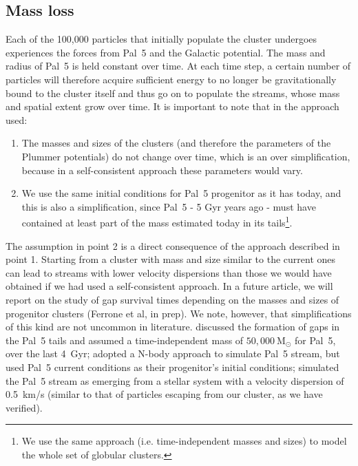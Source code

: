 \documentclass{aa}
\begin{document}
\subsection{Mass loss}\label{sec:mass_loss}

Each of the 100,000 particles that initially populate the cluster undergoes experiences the forces from Pal~5 and the Galactic potential. The mass and radius of Pal~5 is held constant over time. At each time step, a certain number of particles will therefore acquire sufficient energy to no longer be gravitationally bound to the cluster itself and thus go on to populate the streams, whose mass and spatial extent grow over time. It is important to note that in the approach used:

\begin{enumerate}
    \item The masses and sizes of the clusters (and therefore the parameters of the Plummer potentials) do not change over time, which is an over simplification, because in a self-consistent approach these parameters would vary. 
    \item We use the same initial conditions for Pal~5 progenitor as it has today, and this is also a simplification, since Pal~5 - 5 Gyr years ago - must have contained at least part of the mass estimated today in its tails\footnote{We use the same approach (i.e. time-independent masses and sizes) to model the whole set of globular clusters.}. 
\end{enumerate}

The assumption in point 2 is a direct consequence of the approach described in point 1. Starting from a cluster with mass and size similar to the current ones can lead to streams with lower velocity dispersions than those we would have obtained if we had used a self-consistent approach. In a future article, we will report on the study of gap survival times depending on the masses and sizes of progenitor clusters (Ferrone et al, in prep). We note, however, that simplifications of this kind are not uncommon in literature. \citet{2017NatAs...1..633P} discussed the formation of gaps in the Pal~5 tails and assumed a time-independent mass of $50,000 ~\textrm{M}_\odot$ for Pal~5, over the last 4~Gyr; \citet{2017MNRAS.470...60E} adopted a N-body approach to simulate Pal~5 stream, but used Pal~5 current conditions as their progenitor's initial conditions; \citet{2019MNRAS.484.2009B} simulated the Pal~5 stream as emerging from a stellar system with a velocity dispersion of 0.5~km/s (similar to that of particles escaping from our cluster, as we have verified). 
\end{document}
